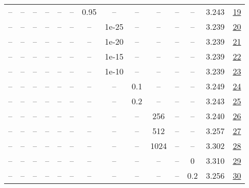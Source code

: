 \begin{table}[H]
\begin{tabular}{cccccccccccccc}
-- & -- & -- & -- & -- & -- & 0.95 & -- & -- & -- & -- & -- & 3.243 & \href{https://wandb.ai/stanford-mercury/optimizer-scaling/runs/sweep-130m-21B-muonaaa155lr0.008-wd0.1-minlr0-warmup0-b10.8-b20.-1a184f}{19} \\
-- & -- & -- & -- & -- & -- & -- & 1e-25 & -- & -- & -- & -- & 3.239 & \href{https://wandb.ai/stanford-mercury/optimizer-scaling/runs/sweep-130m-21B-muonf5a17flr0.008-wd0.1-minlr0-warmup0-b10.8-b20.-d3ea9f}{20} \\
-- & -- & -- & -- & -- & -- & -- & 1e-20 & -- & -- & -- & -- & 3.239 & \href{https://wandb.ai/stanford-mercury/optimizer-scaling/runs/sweep-130m-21B-muonba539dlr0.008-wd0.1-minlr0-warmup0-b10.8-b20.-be254c}{21} \\
-- & -- & -- & -- & -- & -- & -- & 1e-15 & -- & -- & -- & -- & 3.239 & \href{https://wandb.ai/stanford-mercury/optimizer-scaling/runs/sweep-130m-21B-muon76efcelr0.008-wd0.1-minlr0-warmup0-b10.8-b20.-47ca65}{22} \\
-- & -- & -- & -- & -- & -- & -- & 1e-10 & -- & -- & -- & -- & 3.239 & \href{https://wandb.ai/stanford-mercury/optimizer-scaling/runs/sweep-130m-21B-muond1317flr0.008-wd0.1-minlr0-warmup0-b10.8-b20.-b6514e}{23} \\
-- & -- & -- & -- & -- & -- & -- & -- & 0.1 & -- & -- & -- & 3.249 & \href{https://wandb.ai/stanford-mercury/optimizer-scaling/runs/sweep-130m-21B-muondf893alr0.008-wd0.1-minlr0-warmup0-b10.8-b20.-9ec54b}{24} \\
-- & -- & -- & -- & -- & -- & -- & -- & 0.2 & -- & -- & -- & 3.243 & \href{https://wandb.ai/stanford-mercury/optimizer-scaling/runs/sweep-130m-21B-muon5db4falr0.008-wd0.1-minlr0-warmup0-b10.8-b20.-642691}{25} \\
-- & -- & -- & -- & -- & -- & -- & -- & -- & 256 & -- & -- & 3.240 & \href{https://wandb.ai/stanford-mercury/optimizer-scaling/runs/sweep-130m-21B-muon284dcblr0.008-wd0.1-minlr0-warmup0-b10.8-b20.-103e2d}{26} \\
-- & -- & -- & -- & -- & -- & -- & -- & -- & 512 & -- & -- & 3.257 & \href{https://wandb.ai/stanford-mercury/optimizer-scaling/runs/sweep-130m-21B-muonfc6df6lr0.008-wd0.1-minlr0-warmup0-b10.8-b20.-e8f442}{27} \\
-- & -- & -- & -- & -- & -- & -- & -- & -- & 1024 & -- & -- & 3.302 & \href{https://wandb.ai/stanford-mercury/optimizer-scaling/runs/sweep-130m-21B-muonc12bf0lr0.008-wd0.1-minlr0-warmup0-b10.8-b20.-3a6695}{28} \\
-- & -- & -- & -- & -- & -- & -- & -- & -- & -- & -- & 0 & 3.310 & \href{https://wandb.ai/stanford-mercury/optimizer-scaling/runs/sweep-130m-21B-muon20f1celr0.008-wd0-minlr0-warmup0-b10.8-b20.98-0351b6}{29} \\
-- & -- & -- & -- & -- & -- & -- & -- & -- & -- & -- & 0.2 & 3.256 & \href{https://wandb.ai/stanford-mercury/optimizer-scaling/runs/sweep-130m-21B-muon11e37alr0.008-wd0.2-minlr0-warmup0-b10.8-b20.-9c2c15}{30} \\
\bottomrule
\end{tabular}
\end{table}

